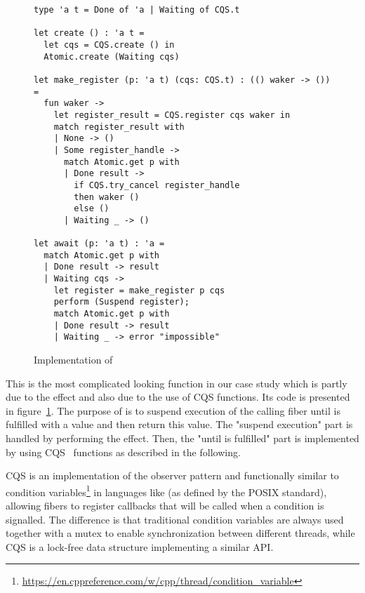 \begin{figure}[ht]
  \begin{verbatim}
type 'a t = Done of 'a | Waiting of CQS.t

let create () : 'a t = 
  let cqs = CQS.create () in
  Atomic.create (Waiting cqs)

let make_register (p: 'a t) (cqs: CQS.t) : (() waker -> ()) = 
  fun waker ->
    let register_result = CQS.register cqs waker in
    match register_result with
    | None -> ()
    | Some register_handle ->
      match Atomic.get p with
      | Done result ->  
        if CQS.try_cancel register_handle
        then waker ()
        else ()
      | Waiting _ -> ()

let await (p: 'a t) : 'a = 
  match Atomic.get p with
  | Done result -> result
  | Waiting cqs ->
    let register = make_register p cqs
    perform (Suspend register);
    match Atomic.get p with
    | Done result -> result 
    | Waiting _ -> error "impossible"
  \end{verbatim}
  \caption{Implementation of }
  \label{fig:sched-impl-await}
\end{figure}

This is the most complicated looking function in our case study which is partly due to the \esuspend{} effect and also due to the use of CQS functions.
Its code is presented in figure~\ref{fig:sched-impl-await}.
The purpose of  is to suspend execution of the calling fiber until  is fulfilled with a value and then return this value.
The "suspend execution" part is handled by performing the \esuspend{} effect.
Then, the "until  is fulfilled" part is implemented by using CQS~\cite{koval2023cqs} functions as described in the following.

CQS is an implementation of the observer pattern and functionally similar to condition variables\footnote{\url{https://en.cppreference.com/w/cpp/thread/condition_variable}} in languages like \CC{} (as defined by the POSIX standard), allowing fibers to register callbacks that will be called when a condition is signalled.
The difference is that traditional condition variables are always used together with a mutex to enable synchronization between different threads, while CQS is a lock-free data structure implementing a similar API.

